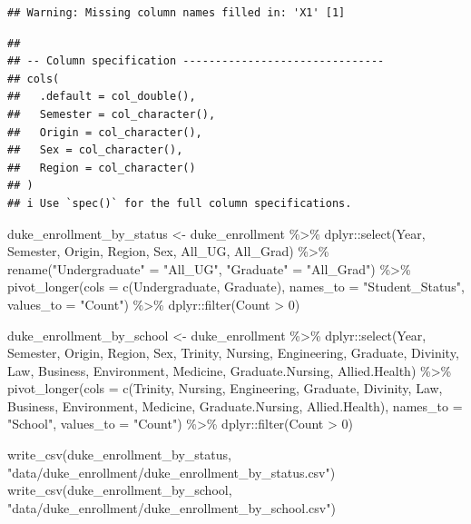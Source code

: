 \documentclass[
]{krantz}
\makeatletter
\newenvironment{Shaded}{\begin{snugshade}}{\end{snugshade}}
\newcommand{\AttributeTok}[1]{\textcolor[rgb]{0.61,0.61,0.61}{#1}}
\newcommand{\DecValTok}[1]{\textcolor[rgb]{0.06,0.06,0.06}{#1}}
\newcommand{\FunctionTok}[1]{\textcolor[rgb]{0,0,0}{#1}}
\newcommand{\NormalTok}[1]{#1}
\newcommand{\OtherTok}[1]{\textcolor[rgb]{0.37,0.37,0.37}{#1}}
\newcommand{\SpecialCharTok}[1]{\textcolor[rgb]{0,0,0}{#1}}
\newcommand{\StringTok}[1]{\textcolor[rgb]{0.5,0.5,0.5}{#1}}
\newenvironment{kframe}{%
\medskip{}
\setlength{\fboxsep}{.8em}
 \def\at@end@of@kframe{}%
 \ifinner\ifhmode%
  \def\at@end@of@kframe{\end{minipage}}%
  \begin{minipage}{\columnwidth}%
 \fi\fi%
 \def\FrameCommand##1{\hskip\@totalleftmargin \hskip-\fboxsep
 \colorbox{shadecolor}{##1}\hskip-\fboxsep
     \hskip-\linewidth \hskip-\@totalleftmargin \hskip\columnwidth}%
 \MakeFramed {\advance\hsize-\width
   \@totalleftmargin\z@ \linewidth\hsize
   \@setminipage}}%
 {\par\unskip\endMakeFramed%
 \at@end@of@kframe}
\renewenvironment{Shaded}{\begin{kframe}}{\end{kframe}}
\makeatother
\begin{document}
\begin{verbatim}
## Warning: Missing column names filled in: 'X1' [1]
\end{verbatim}

\begin{verbatim}
## 
## -- Column specification -------------------------------
## cols(
##   .default = col_double(),
##   Semester = col_character(),
##   Origin = col_character(),
##   Sex = col_character(),
##   Region = col_character()
## )
## i Use `spec()` for the full column specifications.
\end{verbatim}

\begin{Shaded}
\begin{Highlighting}[]
\NormalTok{duke\_enrollment\_by\_status }\OtherTok{\textless{}{-}}\NormalTok{ duke\_enrollment }\SpecialCharTok{\%\textgreater{}\%}
\NormalTok{  dplyr}\SpecialCharTok{::}\FunctionTok{select}\NormalTok{(Year, Semester, Origin, Region, Sex, All\_UG, All\_Grad) }\SpecialCharTok{\%\textgreater{}\%}
  \FunctionTok{rename}\NormalTok{(}\StringTok{"Undergraduate"} \OtherTok{=} \StringTok{"All\_UG"}\NormalTok{, }\StringTok{"Graduate"} \OtherTok{=} \StringTok{"All\_Grad"}\NormalTok{) }\SpecialCharTok{\%\textgreater{}\%}
  \FunctionTok{pivot\_longer}\NormalTok{(}\AttributeTok{cols =} \FunctionTok{c}\NormalTok{(Undergraduate, Graduate), }
               \AttributeTok{names\_to =} \StringTok{"Student\_Status"}\NormalTok{, }
               \AttributeTok{values\_to =} \StringTok{"Count"}\NormalTok{) }\SpecialCharTok{\%\textgreater{}\%}
\NormalTok{  dplyr}\SpecialCharTok{::}\FunctionTok{filter}\NormalTok{(Count }\SpecialCharTok{\textgreater{}} \DecValTok{0}\NormalTok{)}

\NormalTok{duke\_enrollment\_by\_school }\OtherTok{\textless{}{-}}\NormalTok{ duke\_enrollment }\SpecialCharTok{\%\textgreater{}\%}
\NormalTok{  dplyr}\SpecialCharTok{::}\FunctionTok{select}\NormalTok{(Year, Semester, Origin, Region, Sex, Trinity, Nursing, }
\NormalTok{                Engineering, Graduate, Divinity, Law, Business, Environment, }
\NormalTok{                Medicine, Graduate.Nursing, Allied.Health) }\SpecialCharTok{\%\textgreater{}\%}
  \FunctionTok{pivot\_longer}\NormalTok{(}\AttributeTok{cols =} \FunctionTok{c}\NormalTok{(Trinity, Nursing, Engineering, Graduate, Divinity, Law, }
\NormalTok{                        Business, Environment, Medicine, Graduate.Nursing, }
\NormalTok{                        Allied.Health), }\AttributeTok{names\_to =} \StringTok{"School"}\NormalTok{, }\AttributeTok{values\_to =} \StringTok{"Count"}\NormalTok{) }\SpecialCharTok{\%\textgreater{}\%}
\NormalTok{  dplyr}\SpecialCharTok{::}\FunctionTok{filter}\NormalTok{(Count }\SpecialCharTok{\textgreater{}} \DecValTok{0}\NormalTok{)}

\FunctionTok{write\_csv}\NormalTok{(duke\_enrollment\_by\_status, }\StringTok{"data/duke\_enrollment/duke\_enrollment\_by\_status.csv"}\NormalTok{)}
\FunctionTok{write\_csv}\NormalTok{(duke\_enrollment\_by\_school, }\StringTok{"data/duke\_enrollment/duke\_enrollment\_by\_school.csv"}\NormalTok{)}
\end{Highlighting}
\end{Shaded}
\end{document}
